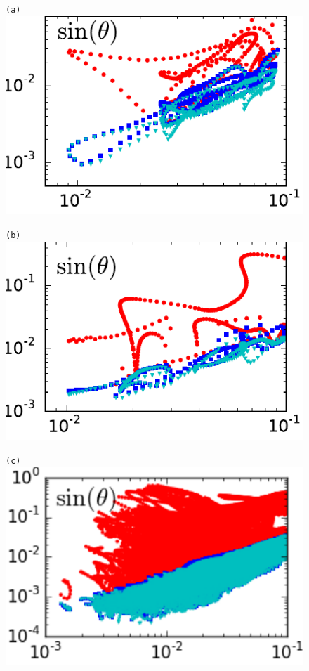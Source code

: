 \documentclass[prl,aps,preprint,showpacs]{revtex4-1} %
\begin{document}
\begin{figure}[h]
  \centering
  \begin{minipage}{.23\textwidth}
    \centering \small{\texttt{(a)}}
    \includegraphics[width=\textwidth]{ppo4No6}
  \end{minipage}
  \begin{minipage}{.23\textwidth}
    \centering \small{\texttt{(b)}}
    \includegraphics[width=\textwidth]{rpo4No1}
  \end{minipage}
  \begin{minipage}{.23\textwidth}
    \centering \small{\texttt{(c)}}
    \includegraphics[width=\textwidth]{rpo4many}

\end{minipage}
\end{figure}
\end{document}
